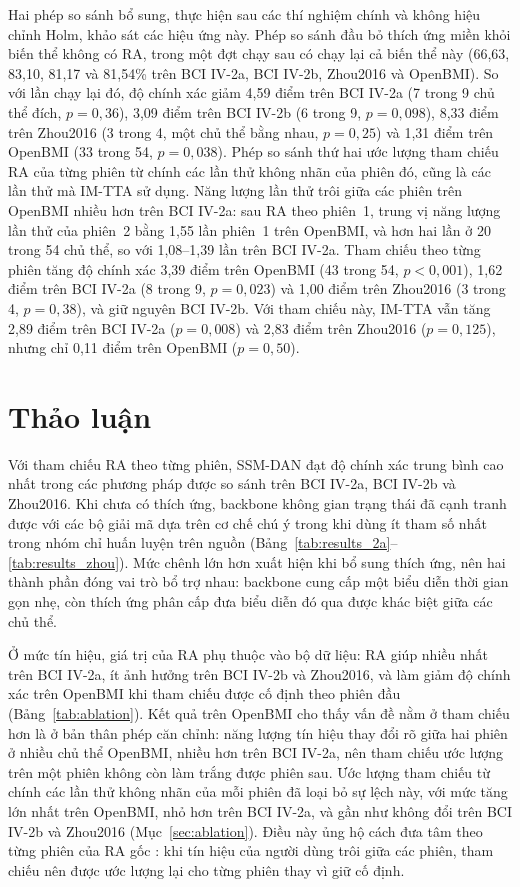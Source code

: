 \documentclass[preprint,12pt]{elsarticle}
\begin{document}
Hai phép so sánh bổ sung, thực hiện sau các thí nghiệm chính và không hiệu chỉnh Holm, khảo sát các hiệu ứng này. Phép so sánh đầu bỏ thích ứng miền khỏi biến thể không có RA, trong một đợt chạy sau có chạy lại cả biến thể này (66,63, 83,10, 81,17 và 81,54\% trên BCI IV-2a, BCI IV-2b, Zhou2016 và OpenBMI). So với lần chạy lại đó, độ chính xác giảm 4,59 điểm trên BCI IV-2a (7 trong 9 chủ thể đích, $p=0{,}36$), 3,09 điểm trên BCI IV-2b (6 trong 9, $p=0{,}098$), 8,33 điểm trên Zhou2016 (3 trong 4, một chủ thể bằng nhau, $p=0{,}25$) và 1,31 điểm trên OpenBMI (33 trong 54, $p=0{,}038$). Phép so sánh thứ hai ước lượng tham chiếu RA của từng phiên từ chính các lần thử không nhãn của phiên đó, cũng là các lần thử mà IM-TTA sử dụng. Năng lượng lần thử trôi giữa các phiên trên OpenBMI nhiều hơn trên BCI IV-2a: sau RA theo phiên~1, trung vị năng lượng lần thử của phiên~2 bằng 1,55 lần phiên~1 trên OpenBMI, và hơn hai lần ở 20 trong 54 chủ thể, so với 1,08--1,39 lần trên BCI IV-2a. Tham chiếu theo từng phiên tăng độ chính xác 3,39 điểm trên OpenBMI (43 trong 54, $p<0{,}001$), 1,62 điểm trên BCI IV-2a (8 trong 9, $p=0{,}023$) và 1,00 điểm trên Zhou2016 (3 trong 4, $p=0{,}38$), và giữ nguyên BCI IV-2b. Với tham chiếu này, IM-TTA vẫn tăng 2,89 điểm trên BCI IV-2a ($p=0{,}008$) và 2,83 điểm trên Zhou2016 ($p=0{,}125$), nhưng chỉ 0,11 điểm trên OpenBMI ($p=0{,}50$).

\section{Thảo luận}
\label{sec:discussion}

Với tham chiếu RA theo từng phiên, SSM-DAN đạt độ chính xác trung bình cao nhất trong các phương pháp được so sánh trên BCI IV-2a, BCI IV-2b và Zhou2016. Khi chưa có thích ứng, backbone không gian trạng thái đã cạnh tranh được với các bộ giải mã dựa trên cơ chế chú ý trong khi dùng ít tham số nhất trong nhóm chỉ huấn luyện trên nguồn (Bảng~\ref{tab:results_2a}--\ref{tab:results_zhou}). Mức chênh lớn hơn xuất hiện khi bổ sung thích ứng, nên hai thành phần đóng vai trò bổ trợ nhau: backbone cung cấp một biểu diễn thời gian gọn nhẹ, còn thích ứng phân cấp đưa biểu diễn đó qua được khác biệt giữa các chủ thể.

Ở mức tín hiệu, giá trị của RA phụ thuộc vào bộ dữ liệu: RA giúp nhiều nhất trên BCI IV-2a, ít ảnh hưởng trên BCI IV-2b và Zhou2016, và làm giảm độ chính xác trên OpenBMI khi tham chiếu được cố định theo phiên đầu (Bảng~\ref{tab:ablation}). Kết quả trên OpenBMI cho thấy vấn đề nằm ở tham chiếu hơn là ở bản thân phép căn chỉnh\label{subsec:ra_reference}: năng lượng tín hiệu thay đổi rõ giữa hai phiên ở nhiều chủ thể OpenBMI, nhiều hơn trên BCI IV-2a, nên tham chiếu ước lượng trên một phiên không còn làm trắng được phiên sau. Ước lượng tham chiếu từ chính các lần thử không nhãn của mỗi phiên đã loại bỏ sự lệch này, với mức tăng lớn nhất trên OpenBMI, nhỏ hơn trên BCI IV-2a, và gần như không đổi trên BCI IV-2b và Zhou2016 (Mục~\ref{sec:ablation}). Điều này ủng hộ cách đưa tâm theo từng phiên của RA gốc \cite{zanini2018riemannian}: khi tín hiệu của người dùng trôi giữa các phiên, tham chiếu nên được ước lượng lại cho từng phiên thay vì giữ cố định.
\end{document}

